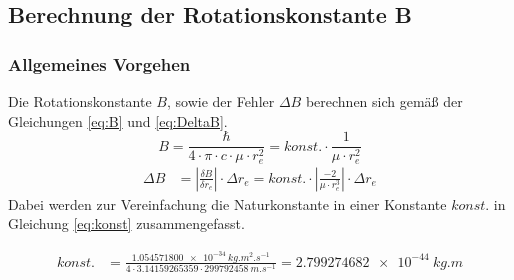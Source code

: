 







\subsection{Berechnung der Rotationskonstante B}
\subsubsection*{Allgemeines Vorgehen}
Die Rotationskonstante $B$, sowie der Fehler $\Delta B$ berechnen sich gemäß der Gleichungen \ref{eq:B} und \ref{eq:DeltaB}.
\begin{equation}
B 	   			= \frac{\hbar}{4 \cdot \pi \cdot c \cdot \mu  \cdot r_e^{2}}  			
   			= konst.\cdot\frac{1}{\mu  \cdot r_e^{2}}\label{eq:B}
\end{equation}
\begin{align}   			
\Delta B	
   			&=  \left|\frac{\delta B}{\delta r_e}\right|\cdot\Delta r_e =konst. \cdot\left|\frac{-2}{\mu \cdot r_e^{3}  }\right|\cdot \Delta r_e  	\label{eq:DeltaB}	
\end{align}
Dabei werden zur Vereinfachung die Naturkonstante in einer Konstante $konst.$ in Gleichung \ref{eq:konst} zusammengefasst.


\begin{align}
\label{eq:konst}
konst.&= 			 \frac{\SI[mode=math]{1.054571800e-34}{kg.m^2.s^{-1}}}{4\cdot 3.14159265359 \cdot \SI[mode=math]{299792458}{m.s^{-1}}}=\SI[mode=math]{2.799274682e-44}{kg.m}  				
\end{align}







